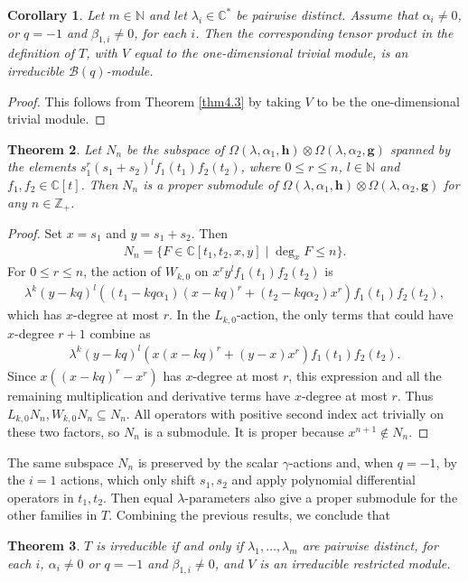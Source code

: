 \documentclass[a4paper]{amsart}
\numberwithin{equation}{section}
\newtheorem{theorem}{Theorem}[section]
\newtheorem{corollary}[theorem]{Corollary}
\begin{document}
\begin{corollary}
Let $m\in\mathbb N$ and let $\lambda_i\in\mathbb C^*$ be pairwise distinct. Assume that $\alpha_i\neq0$, or $q=-1$ and $\beta_{1,i}\neq0$, for each $i$. Then the corresponding tensor product in the definition of $T$, with $V$ equal to the one-dimensional trivial module, is an irreducible $\mathcal B(q)$-module.
\end{corollary}
\begin{proof}
    This follows from Theorem \ref{thm4.3} by taking $V$ to be the one-dimensional trivial module.
\end{proof}
\begin{theorem}
    Let $N_{n}$ be the subspace of $\Omega(\lambda,\alpha_{1},\mathbf{h})\otimes \Omega(\lambda,\alpha_{2},\mathbf{g})$ spanned by the elements $s_{1}^{r}(s_{1}+s_{2})^{l}f_{1}(t_1)f_{2}(t_2)$, where $0\leq r \leq n$, $l\in\mathbb{N}$ and $f_1,f_2\in\mathbb C[t]$. Then $N_{n}$ is a proper submodule of $\Omega(\lambda,\alpha_{1},\mathbf{h})\otimes \Omega(\lambda,\alpha_{2},\mathbf{g})$ for any $n\in\mathbb{Z}_{+}$.
\end{theorem}
\begin{proof}
Set $x=s_1$ and $y=s_1+s_2$. Then
\begin{align*}
N_n=\{F\in\mathbb C[t_1,t_2,x,y]\mid \deg_xF\leq n\}.
\end{align*}
For $0\leq r\leq n$, the action of $W_{k,0}$ on
$x^ry^lf_1(t_1)f_2(t_2)$ is
\begin{align*}
\lambda^k(y-kq)^l\left(
(t_1-kq\alpha_1)(x-kq)^r
+(t_2-kq\alpha_2)x^r\right)f_1(t_1)f_2(t_2),
\end{align*}
which has $x$-degree at most $r$. In the $L_{k,0}$-action, the only terms that could have $x$-degree $r+1$ combine as
\begin{align*}
\lambda^k(y-kq)^l
\left(x(x-kq)^r+(y-x)x^r\right)f_1(t_1)f_2(t_2).
\end{align*}
Since $x((x-kq)^r-x^r)$ has $x$-degree at most $r$, this expression and all the remaining multiplication and derivative terms have $x$-degree at most $r$. Thus $L_{k,0}N_n,W_{k,0}N_n\subseteq N_n$. All operators with positive second index act trivially on these two factors, so $N_n$ is a submodule. It is proper because $x^{n+1}\notin N_n$.
\end{proof}
The same subspace $N_n$ is preserved by the scalar $\gamma$-actions and, when $q=-1$, by the $i=1$ actions, which only shift $s_1,s_2$ and apply polynomial differential operators in $t_1,t_2$. Then equal $\lambda$-parameters also give a proper submodule for the other families in $T$.
Combining the previous results, we conclude that
\begin{theorem}\label{thm4.6}
    $T$ is irreducible if and only if $\lambda_{1},\ldots,\lambda_{m}$ are pairwise distinct, for each $i$, $\alpha_i\neq0$ or $q=-1$ and $\beta_{1,i}\neq0$, and $V$ is an irreducible restricted module.
\end{theorem}
\end{document}
